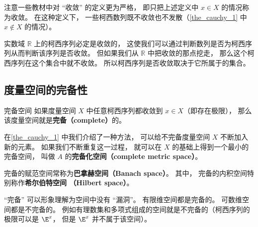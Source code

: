 注意一些教材中对 “收敛” 的定义更为严格， 即只把上述定义中 $x \in X$ 的情况称为收敛。 在这种定义下， 一些柯西数列既不收敛也不发散（\autoref{the_cauchy_1} 中 $x\notin X$ 的情况）。




实数域 $\mathbb R$ 上的柯西序列必定是收敛的， 这使我们可以通过判断数列是否为柯西序列从而判断该序列是否收敛。 但如果我们从 $\mathbb R$ 中把收敛的那点挖走， 那么这个柯西序列在这个集合中就不收敛。 所以柯西序列是否收敛取决于它所属于的集合。 %

\subsection{度量空间的完备性}

\begin{definition}{完备空间}\label{def_cauchy_2}
如果度量空间 $X$ 中任意柯西序列都收敛到 $x\in X$（即存在极限）， 那么该度量空间就是\textbf{完备（complete）}的。
\end{definition}

在\autoref{the_cauchy_1} 中我们介绍了一种方法， 可以给不完备度量空间 $X$ 不断加入新的元素。 如果我们不断重复这一过程， 就可以在 $X$ 的基础上得到一个最小的完备空间， 叫做 $A$ 的\textbf{完备化空间（complete metric space）}。


完备的赋范空间常称为\textbf{巴拿赫空间（Banach space）}。 其中， 完备的内积空间特别称作\textbf{希尔伯特空间 （Hilbert space）}。

“完备” 可以形象理解为空间中没有 “漏洞”。 有限维空间都是完备的。 可数维空间都是不完备的。 例如有理数集和多项式组成的空间就是不完备的（柯西序列的极限可以是 $\E^x$， 但是 $\E^x$ 并不属于该空间）。

